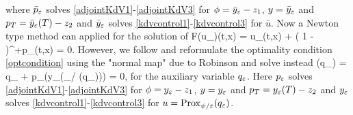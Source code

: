 \ee
where $\bar p_\varepsilon$ solves \eqref{adjointKdV1}-\eqref{adjointKdV3} for $\phi=\bar y_\varepsilon-z_1$, $y=\bar y_\varepsilon$ and $p_T=\bar y_\varepsilon(T)-z_2$ and $\bar y_\varepsilon$ solves \eqref{kdvcontrol1}-\eqref{kdvcontrol3} for $\bar u$. Now a Newton type method can applied for the solution of
\be
F(u_{\rg})(t,x) = \rg u_{\rg}(t,x) + \left( 1 - \right)^{+}p_{\rg}(t,x) = 0.
\label{optcondition}
\ee
However, we follow \cite{pieperthesis} and reformulate the optimality condition \eqref{optcondition} using the "normal map" due to Robinson and solve instead  
\be
{}(q_{\rg}) = \rg q_{\rg} + p_{\rg}(y_\rg(_{\psi/ \rg}(q_{\rg}))) = 0,
\label{normalmap}
\ee
for the auxiliary variable $q_{\varepsilon}$. Here $p_\varepsilon$ solves \eqref{adjointKdV1}-\eqref{adjointKdV3} for $\phi=y_\varepsilon-z_1$, $y=y_\varepsilon$ and $p_T=y_\varepsilon(T)-z_2$ and $y_\varepsilon$ solves \eqref{kdvcontrol1}-\eqref{kdvcontrol3} for $u=\operatorname{Prox}_{\psi/ \varepsilon}(q_{\varepsilon})$.  %

